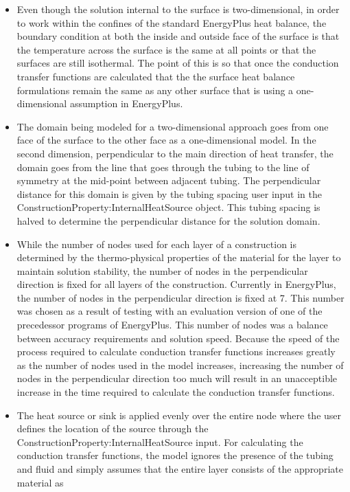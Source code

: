 \begin{itemize}
\item
Even though the solution internal to the surface is two-dimensional, in order to work within the confines of the standard EnergyPlus heat balance, the boundary condition at both the inside and outside face of the surface is that the temperature across the surface is the same at all points or that the surfaces are still isothermal.  The point of this is so that once the conduction transfer functions are calculated that the the surface heat balance formulations remain the same as any other surface that is using a one-dimensional assumption in EnergyPlus.
\item
The domain being modeled for a two-dimensional approach goes from one face of
the surface to the other face as a one-dimensional model.  In the second
dimension, perpendicular to the main direction of heat transfer, the domain
goes from the line that goes through the tubing to the line of symmetry at the
mid-point between adjacent tubing.  The perpendicular distance for this domain
is given by the tubing spacing user input in the
ConstructionProperty:InternalHeatSource object.  This tubing spacing is halved
to determine the perpendicular distance for the solution domain.
\item
While the number of nodes used for each layer of a construction is determined by the thermo-physical properties of the material for the layer to maintain solution stability, the number of nodes in the perpendicular direction is fixed for all layers of the construction.  Currently in EnergyPlus, the number of nodes in the perpendicular direction is fixed at 7.  This number was chosen as a result of testing with an evaluation version of one of the precedessor programs of EnergyPlus.  This number of nodes was a balance between accuracy requirements and solution speed.  Because the speed of the process required to calculate conduction transfer functions increases greatly as the number of nodes used in the model increases, increasing the number of nodes in the perpendicular direction too much will result in an unacceptible increase in the time required to calculate the conduction transfer functions.
\item
The heat source or sink is applied evenly over the entire node where the user
defines the location of the source through the
ConstructionProperty:InternalHeatSource input.  For calculating the conduction
transfer functions, the model ignores the presence of the tubing and fluid and
simply assumes that the entire layer consists of the appropriate material as

\end{itemize}
